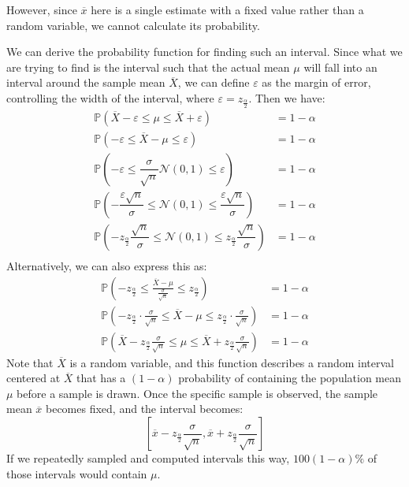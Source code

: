 However, since \(\overline{x}\) here is a single estimate with a fixed value rather than a random variable, we cannot calculate its probability.

We can derive the probability function for finding such an interval. Since what we are trying to find is the interval such that the actual mean \(\mu\) will fall into an interval around the sample mean \(\overline{X}\), we can define \(\varepsilon\) as the margin of error, controlling the width of the interval, where \(\varepsilon = z_{\frac{\alpha}{2}}\). Then we have:
\[
  \begin{aligned}
    \mathbb{P}\left(\overline{X} - \varepsilon \leq \mu \leq \overline{X} + \varepsilon\right) &= 1 - \alpha \\
    \mathbb{P}\left(-\varepsilon \leq \overline{X} - \mu \leq \varepsilon\right) &= 1 - \alpha \\
    \mathbb{P}\left(-\varepsilon \leq \dfrac{\sigma}{\sqrt{n}} \mathcal{N}(0, 1) \leq \varepsilon\right) &= 1 - \alpha \\
    \mathbb{P}\left(-\dfrac{\varepsilon\sqrt{n}}{\sigma} \leq \mathcal{N}(0, 1) \leq \dfrac{\varepsilon\sqrt{n}}{\sigma}\right) &= 1 - \alpha \\
    \mathbb{P}\left(-z_{\frac{\alpha}{2}}\dfrac{\sqrt{n}}{\sigma} \leq \mathcal{N}(0, 1) \leq z_{\frac{\alpha}{2}}\dfrac{\sqrt{n}}{\sigma}\right) &= 1 - \alpha \\
  \end{aligned}
\]
Alternatively, we can also express this as:
\[
  \begin{aligned}
    \mathbb{P}\left(-z_{\frac{\alpha}{2}} \leq \frac{\overline{X}- \mu}{\frac{\sigma}{\sqrt{n}}} \leq z_{\frac{\alpha}{2}}\right) &= 1 - \alpha \\
    \mathbb{P}\left(-z_{\frac{\alpha}{2}} \cdot \frac{\sigma}{\sqrt{n}} \leq \overline{X} - \mu \leq z_{\frac{\alpha}{2}} \cdot \frac{\sigma}{\sqrt{n}} \right) &= 1 - \alpha \\
    \mathbb{P}\left(\overline{X} - z_{\frac{\alpha}{2}} \frac{\sigma}{\sqrt{n}} \leq \mu \leq \overline{X} + z_{\frac{\alpha}{2}} \frac{\sigma}{\sqrt{n}}\right) &= 1 - \alpha
  \end{aligned}
\]
Note that \(\overline{X}\) is a random variable, and this function describes a random interval centered at \(\overline{X}\) that has a \((1 - \alpha)\) probability of containing the population mean \(\mu\) before a sample is drawn. Once the specific sample is observed, the sample mean \(\overline{x}\) becomes fixed, and the interval becomes:
\[
  \left[\overline{x} - z_{\frac{\alpha}{2}} \frac{\sigma}{\sqrt{n}}, \overline{x} + z_{\frac{\alpha}{2}} \frac{\sigma}{\sqrt{n}}\right]
\]
If we repeatedly sampled and computed intervals this way, \(100(1 - \alpha)\%\) of those intervals would contain \(\mu\).

